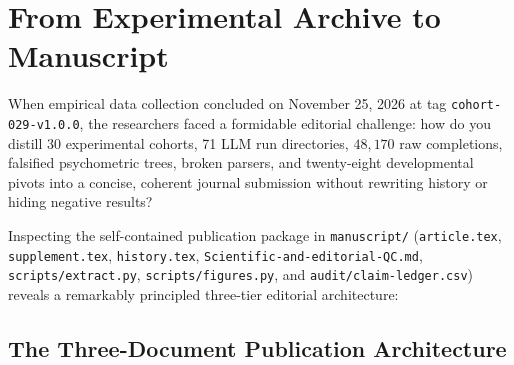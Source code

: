 \chapter{From Experimental Archive to Manuscript}\label{ch:making_paper}

When empirical data collection concluded on November 25, 2026 at tag \texttt{cohort-029-v1.0.0}, the researchers faced a formidable editorial challenge: how do you distill 30 experimental cohorts, 71 LLM run directories, $48{,}170$ raw completions, falsified psychometric trees, broken parsers, and twenty-eight developmental pivots into a concise, coherent journal submission without rewriting history or hiding negative results?

Inspecting the self-contained publication package in \texttt{manuscript/} (\texttt{article.tex}, \texttt{supplement.tex}, \texttt{history.tex}, \texttt{Scientific-and-editorial-QC.md}, \texttt{scripts/extract.py}, \texttt{scripts/figures.py}, and \texttt{audit/claim-ledger.csv}) reveals a remarkably principled three-tier editorial architecture:

\section{The Three-Document Publication Architecture}

